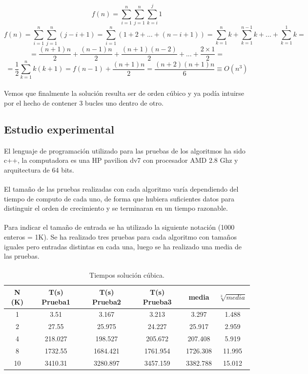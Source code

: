\documentclass[es]{ifirak}
\begin{document}
$$f(n)= \sum_{i=1}^{n}\sum_{j=1}^{n}\sum_{k=i}^{j} 1 $$
$$f(n)=\sum_{i=1}^{n}\sum_{j=1}^{n}(j-i+1)
 =\sum_{i=1}^{n}(1+2+...+(n-i+1))
 =\sum_{k=1}^{n}k + \sum_{k=1}^{n-1}k + ... + \sum_{k=1}^{1}k=$$
$$ = \frac{(n+1)n}{2} + \frac{(n-1)n}{2} + \frac{(n+1)(n-2)}{2} +...+ \frac{2\times1}{2}=$$
$$=\frac{1}{2}\sum_{k=1}^{n}k(k+1)
=f(n-1)+\frac{(n+1)n}{2}
=\frac{(n+2)(n+1)n}{6} \equiv O(n^{3})$$
\paragraph{}
Vemos que finalmente la solución resulta ser de orden cúbico y ya podía intuirse por el hecho de contener 3 bucles uno dentro de otro.
\subsection{Estudio experimental}

\paragraph{}
El lenguaje de programación utilizado para las pruebas de los algoritmos ha sido c++, la computadora es una HP pavilion dv7 con procesador AMD 2.8 Ghz y arquitectura de 64 bits.
\paragraph{}
El tamaño de las pruebas realizadas con cada algoritmo varía dependiendo del tiempo de computo de cada uno, de forma que hubiera suficientes datos para distinguir el orden de crecimiento y se terminaran en un tiempo razonable.
\paragraph{}
Para indicar el tamaño de entrada se ha utilizado la siguiente notación (1000 enteros = 1K). Se ha realizado tres pruebas para cada algoritmo con tamaños iguales pero entradas distintas en cada una, luego se ha realizado una media de las pruebas.

\paragraph{}
\begin{center}
	\begin{table}[htbp]
		\centering
		\begin{tabular}{c|c|c|c|c|c}
			N (K) & T(s) Prueba1 & T(s) Prueba2 & T(s) Prueba3 & media & $\sqrt[3]{media}$\\
			\hline
			1 & 3.51 & 3.167 & 3.213 & 3.297 & 1.488\\
			2 & 27.55 & 25.975 & 24.227 & 25.917 & 2.959\\
			4 & 218.027 & 198.527 & 205.672 & 207.408 & 5.919\\
			8 & 1732.55 & 1684.421 & 1761.954 & 1726.308 & 11.995\\
			10 & 3410.31  & 3280.897 & 3457.159 & 3382.788 & 15.012\\
		\end{tabular}
		\caption{Tiempos solución cúbica.}\label{table}
	\end{table}
\end{center}
\end{document}
